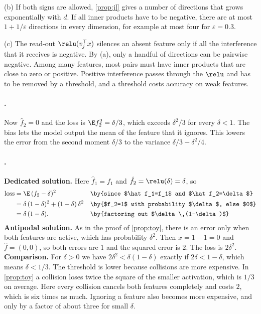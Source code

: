 {(b) If both signs are allowed, \cref{prop:jl} gives a number of directions that grows exponentially with $d$. If
all inner products have to be negative, there are at most $1+1/\varepsilon$ directions in every dimension, for
example at most four for $\varepsilon=0.3$.

(c) The read-out $\relu(v_j^\top x)$ silences an absent feature only if all the interference that it receives is
negative. By (a), only a handful of directions can be pairwise negative. Among many features, most pairs must have
inner products that are close to zero or positive. Positive interference passes through the $\relu$ and has to be
removed by a threshold, and a threshold costs accuracy on weak features.

\paragraph{.}
Now $\hat f_2=0$ and the loss is $\E f_2^2=\delta/3$, which exceeds $\delta^2/3$ for every $\delta<1$. The bias
lets the model output the mean of the feature that it ignores. This lowers the error from the second moment
$\delta/3$ to the variance $\delta/3-\delta^2/4$.

\paragraph{.}
\textbf{Dedicated solution.} Here $\hat f_1=f_1$ and $\hat f_2=\relu(\delta)=\delta$, so
\begin{align*}
\text{loss} &= \E\,(f_2-\delta)^2 && \by{since $\hat f_1=f_1$ and $\hat f_2=\delta$}\\
&= \delta\,(1-\delta)^2+(1-\delta)\,\delta^2 && \by{$f_2=1$ with probability $\delta$, else $0$}\\
&= \delta\,(1-\delta). && \by{factoring out $\delta\,(1-\delta)$}
\end{align*}
\textbf{Antipodal solution.} As in the proof of \cref{prop:toy}, there is an error only when both features are
active, which has probability $\delta^2$. Then $x=1-1=0$ and $\hat f=(0,0)$, so both errors are $1$ and the squared
error is $2$. The loss is $2\delta^2$.
\textbf{Comparison.} For $\delta>0$ we have $2\delta^2<\delta(1-\delta)$ exactly if $2\delta<1-\delta$, which means
$\delta<1/3$. The threshold is lower because collisions are more expensive. In \cref{prop:toy} a collision loses
twice the square of the smaller activation, which is $1/3$ on average. Here every collision cancels both features
completely and costs $2$, which is six times as much. Ignoring a feature also becomes more expensive, and only by
a factor of about three for small $\delta$.

}
